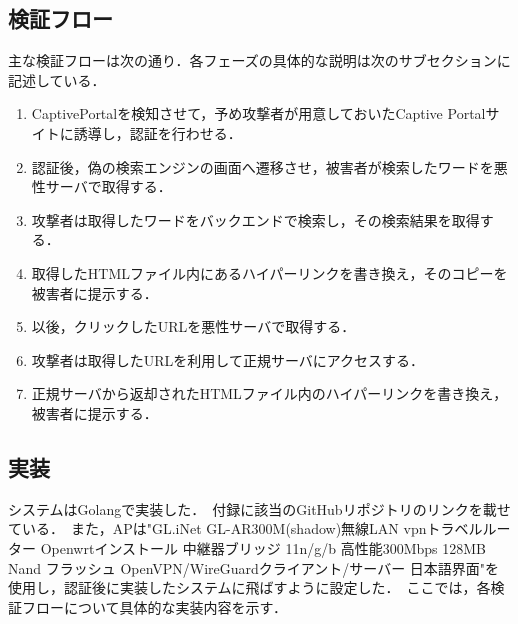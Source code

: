 \documentclass[dvipdfmx,twocolumn]{jsarticle}
\begin{document}
        \subsection{検証フロー}
            主な検証フローは次の通り．各フェーズの具体的な説明は次のサブセクションに記述している．
            \begin{enumerate}
                \item CaptivePortalを検知させて，予め攻撃者が用意しておいたCaptive Portalサイトに誘導し，認証を行わせる．
                \item 認証後，偽の検索エンジンの画面へ遷移させ，被害者が検索したワードを悪性サーバで取得する．
                \item 攻撃者は取得したワードをバックエンドで検索し，その検索結果を取得する．
                \item 取得したHTMLファイル内にあるハイパーリンクを書き換え，そのコピーを被害者に提示する．
                \item 以後，クリックしたURLを悪性サーバで取得する．
                \item 攻撃者は取得したURLを利用して正規サーバにアクセスする．
                \item 正規サーバから返却されたHTMLファイル内のハイパーリンクを書き換え，被害者に提示する．
            \end{enumerate}
        \subsection{実装}
            システムはGolangで実装した．\
            付録に該当のGitHubリポジトリのリンクを載せている．\
            また，APは"GL.iNet GL-AR300M(shadow)無線LAN vpnトラベルルーター Openwrtインストール 中継器ブリッジ 11n/g/b 高性能300Mbps 128MB Nand フラッシュ OpenVPN/WireGuardクライアント/サーバー 日本語界面"を使用し，認証後に実装したシステムに飛ばすように設定した．\
            ここでは，各検証フローについて具体的な実装内容を示す．\
\end{document}

